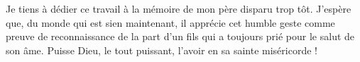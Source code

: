 \dedicace
Je tiens à dédier ce travail à la
mémoire de mon père disparu trop tôt. J’espère que,
du monde qui est sien maintenant, il apprécie cet
humble geste comme preuve de reconnaissance de la
part d’un fils qui a toujours prié pour le salut de son
âme. Puisse Dieu, le tout puissant, l’avoir en sa
sainte miséricorde ! 



